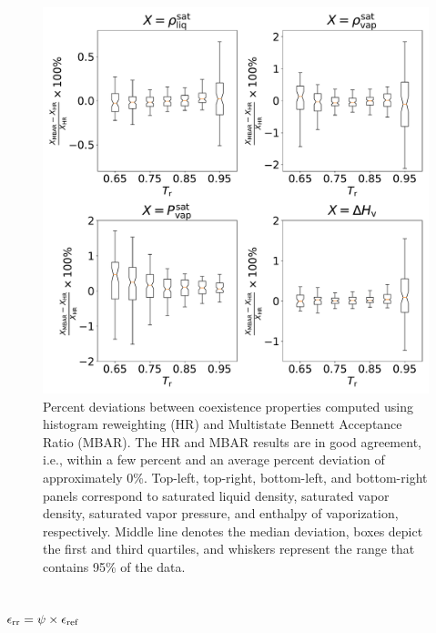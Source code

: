 \documentclass[journal=jced,manuscript=article]{achemso}
\begin{document}
	\begin{figure}[htb!]
		\centering
		\includegraphics[width=6.4in]{Comparison_MBAR_HR_boxplot_CI.pdf}
		\caption{Percent deviations between coexistence properties computed using histogram reweighting (HR) and Multistate Bennett Acceptance Ratio (MBAR). The HR and MBAR results are in good agreement, i.e., within a few percent and an average percent deviation of approximately 0\%. Top-left, top-right, bottom-left, and bottom-right panels correspond to saturated liquid density, saturated vapor density, saturated vapor pressure, and enthalpy of vaporization, respectively. Middle line denotes the median deviation, boxes depict the first and third quartiles, and whiskers represent the range that contains 95\% of the data.}
		\label{fig:comparison MBAR HR}
	\end{figure}


\subsection{$\epsilon_{\rm rr} = \psi \times \epsilon_{\rm ref}$} \label{sec: eps scaling}
\end{document}
